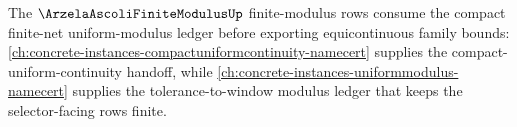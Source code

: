 The $\ArzelaAscoliFiniteModulusUp$ finite-modulus rows consume the compact finite-net uniform-modulus ledger before exporting equicontinuous family bounds: \autoref{ch:concrete-instances-compactuniformcontinuity-namecert} supplies the compact-uniform-continuity handoff, while \autoref{ch:concrete-instances-uniformmodulus-namecert} supplies the tolerance-to-window modulus ledger that keeps the selector-facing rows finite.
